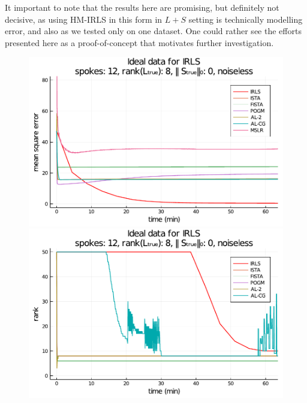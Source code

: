 It important to note that the results here are promising, but definitely not decisive, as using HM-IRLS in this form in $L+S$ setting is technically modelling error, and also as we tested only on one dataset. One could rather see the efforts presented here as a proof-of-concept that motivates further investigation.



\begin{figure}[p]
    \centering
    \begin{minipage}{0.48\linewidth}
        \centering
        \includegraphics[width=\linewidth]{images/ideal_MSE.pdf}
    \end{minipage}
    \begin{minipage}{0.48\linewidth}
        \centering
        \includegraphics[width=\linewidth]{images/ideal_rank.pdf}

\end{minipage}
\end{figure}
